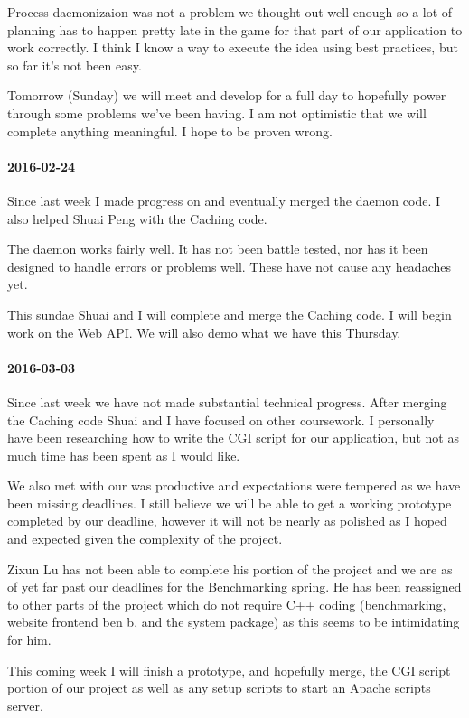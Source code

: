 Process daemonizaion was not a problem we thought out well enough so a lot of planning has to happen pretty late in the game for that part of our application to work correctly.
I think I know a way to execute the idea using best practices, but so far it's not been easy.

Tomorrow (Sunday) we will meet and develop for a full day to hopefully power through some problems we've been  having.
I am not optimistic that we will complete anything meaningful.
I hope to be proven wrong.

\paragraph{2016-02-24}

Since last week I made progress on and eventually merged the daemon code.
I also helped Shuai Peng with the Caching code.

The daemon works fairly well.
It has not been battle tested, nor has it been designed to handle errors or problems well.
These have not cause any headaches yet.

This sundae Shuai and I will complete and merge the Caching code.
I will begin work on the Web API.
We will also demo what we have this Thursday.

\paragraph{2016-03-03}

Since last week we have not made substantial technical progress.
After merging the Caching code Shuai and I have focused on other coursework.
I personally have been researching how to write the CGI script for our application, but not as much time has been spent as I would like.

We also met with our   was productive and expectations were tempered as we have been missing deadlines.
I still believe we will be able to get a working prototype completed by our deadline, however it will not be nearly as polished as I hoped and expected given the complexity of the project.

Zixun Lu has not been able to complete his portion of the project and we are as of yet far past our deadlines for the Benchmarking spring.
He has been reassigned to other parts of the project which do not require C++ coding (benchmarking, website frontend ben b, and the system package) as this seems to be intimidating for him.

This coming week I will finish a prototype, and hopefully merge, the CGI script portion of our project as well as any setup scripts to start an Apache scripts server.

